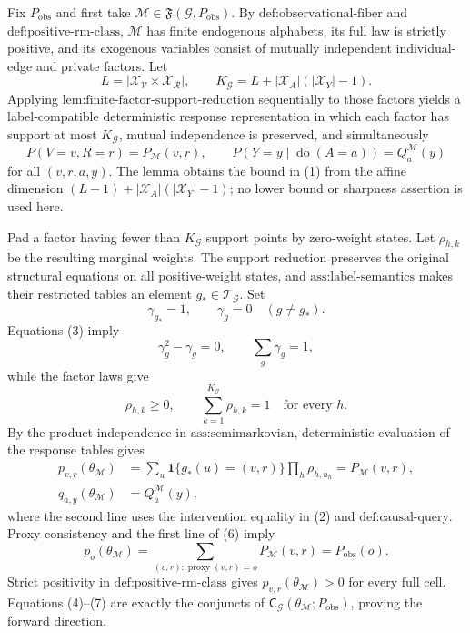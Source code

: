 Fix \(P_{\mathrm{obs}}\) and first take \(\mathcal M\in\mathfrak F(\mathcal G,P_{\mathrm{obs}})\). By \(\text{def:observational-fiber}\) and \(\text{def:positive-rm-class}\), \(\mathcal M\) has finite endogenous alphabets, its full law is strictly positive, and its exogenous variables consist of mutually independent individual-edge and private factors. Let
\[
L=\left|\mathcal X_{\mathcal V}\times\mathcal X_{\mathcal R}\right|,
\qquad
K_{\mathcal G}=L+|\mathcal X_A|(|\mathcal X_Y|-1).
\tag{1}
\]
Applying \(\text{lem:finite-factor-support-reduction}\) sequentially to those factors yields a label-compatible deterministic response representation in which each factor has support at most \(K_{\mathcal G}\), mutual independence is preserved, and simultaneously
\[
P(V=v,R=r)=P_{\mathcal M}(v,r),
\qquad
P(Y=y\mid\operatorname{do}(A=a))=Q_a^{\mathcal M}(y)
\tag{2}
\]
for all \((v,r,a,y)\). The lemma obtains the bound in (1) from the affine dimension \((L-1)+|\mathcal X_A|(|\mathcal X_Y|-1)\); no lower bound or sharpness assertion is used here.

Pad a factor having fewer than \(K_{\mathcal G}\) support points by zero-weight states. Let \(\rho_{h,k}\) be the resulting marginal weights. The support reduction preserves the original structural equations on all positive-weight states, and \(\text{ass:label-semantics}\) makes their restricted tables an element \(g_*\in\mathcal T_{\mathcal G}\). Set
\[
\gamma_{g_*}=1,
\qquad
\gamma_g=0\quad(g\neq g_*).
\tag{3}
\]
Equations (3) imply
\[
\gamma_g^2-\gamma_g=0,
\qquad
\sum_g\gamma_g=1,
\tag{4}
\]
while the factor laws give
\[
\rho_{h,k}\geq0,
\qquad
\sum_{k=1}^{K_{\mathcal G}}\rho_{h,k}=1
\quad\text{for every }h.
\tag{5}
\]
By the product independence in \(\text{ass:semimarkovian}\), deterministic evaluation of the response tables gives
\[
\begin{aligned}
p_{v,r}(\theta_{\mathcal M})
&=\sum_u\mathbf 1\{g_*(u)=(v,r)\}\prod_h\rho_{h,u_h}
=P_{\mathcal M}(v,r),\\
q_{a,y}(\theta_{\mathcal M})
&=Q_a^{\mathcal M}(y),
\end{aligned}
\tag{6}
\]
where the second line uses the intervention equality in (2) and \(\text{def:causal-query}\). Proxy consistency and the first line of (6) imply
\[
p_o(\theta_{\mathcal M})
=\sum_{(v,r):\operatorname{proxy}(v,r)=o}P_{\mathcal M}(v,r)
=P_{\mathrm{obs}}(o).
\tag{7}
\]
Strict positivity in \(\text{def:positive-rm-class}\) gives \(p_{v,r}(\theta_{\mathcal M})>0\) for every full cell. Equations (4)--(7) are exactly the conjuncts of \(\mathsf C_{\mathcal G}(\theta_{\mathcal M};P_{\mathrm{obs}})\), proving the forward direction.

